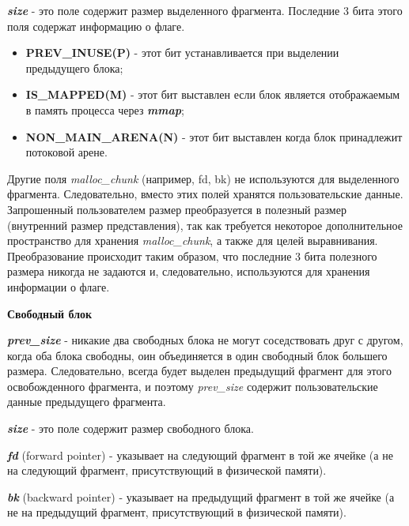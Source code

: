 \textit{\textbf{size}} - это поле содержит размер выделенного фрагмента. Последние 3 бита этого поля содержат информацию о флаге.
\begin{itemize}
	\item \textbf{PREV\_INUSE(P)} - этот бит устанавливается при выделении предыдущего блока;
	\item \textbf{IS\_MAPPED(M)} - этот бит выставлен если блок является отображаемым в память процесса через \textbf{\textit{mmap}};
	\item \textbf{NON\_MAIN\_ARENA(N)} - этот бит выставлен когда блок принадлежит потоковой арене.
\end{itemize}
Другие поля \textit{malloc\_chunk} (например, fd, bk) не используются для выделенного фрагмента. Следовательно, вместо этих полей хранятся пользовательские данные. Запрошенный пользователем размер преобразуется в полезный размер (внутренний размер представления), так как требуется некоторое дополнительное пространство для хранения \textit{malloc\_chunk}, а также для целей выравнивания. Преобразование происходит таким образом, что последние 3 бита полезного размера никогда не задаются и, следовательно, используются для хранения информации о флаге.

\textbf{Свободный блок}

\textit{\textbf{prev\_size}} - никакие два свободных блока не могут соседствовать друг с другом, когда оба блока свободны, оин объединяется в один свободный блок большего размера. Следовательно, всегда будет выделен предыдущий фрагмент для этого освобожденного фрагмента, и поэтому \textit{prev\_size} содержит пользовательские данные предыдущего фрагмента.

\textit{\textbf{size}} - это поле содержит размер свободного блока.

\textit{\textbf{fd}} (forward pointer) - указывает на следующий фрагмент в той же ячейке (а не на следующий фрагмент, присутствующий в физической памяти).

\textit{\textbf{bk}} (backward pointer) - указывает на предыдущий фрагмент в той же ячейке (а не на предыдущий фрагмент, присутствующий в физической памяти).

